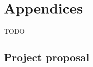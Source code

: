 \documentclass[12pt,a4paper,twoside,notitlepage]{report}
\theoremstyle{definition}
\begin{document}



\appendix
\chapter{Appendices}

TODO

\clearpage
\section{Project proposal} \label{sec:proposal}

\end{document}
